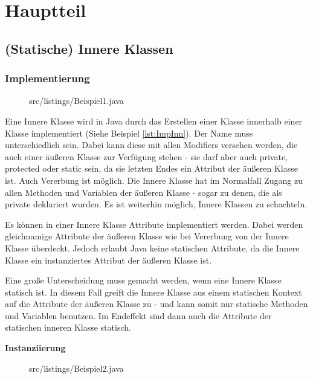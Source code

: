 \chapter{Hauptteil}
\section{(Statische) Innere Klassen}
\subsection {Implementierung}


\begin{figure}[hbt]
\lstset{language=Java}
 {src/listings/Beispiel1.java}
\end{figure}


Eine Innere Klasse wird in Java durch das Erstellen einer Klasse innerhalb einer Klasse implementiert (Siehe Beispiel \ref{lst:ImpInn}). Der Name muss unterschiedlich sein. Dabei kann diese mit allen Modifiers versehen werden, die auch einer äußeren Klasse zur Verfügung stehen - sie darf aber auch private, protected oder static sein, da sie letzten Endes ein Attribut der äußeren Klasse ist.
Auch Vererbung ist möglich. Die Innere Klasse hat im Normalfall Zugang zu allen Methoden und Variablen der äußeren Klasse - sogar zu denen, die als private deklariert wurden. Es ist weiterhin möglich, Innere Klassen zu schachteln. 

Es können in einer Innere Klasse Attribute implementiert werden. Dabei werden gleichnamige Attribute der äußeren Klasse wie bei Vererbung von der Innere Klasse überdeckt. Jedoch erlaubt Java keine statischen Attribute, da die Innere Klasse ein instanziertes Attribut der äußeren Klasse ist.

Eine große Unterscheidung muss gemacht werden, wenn eine Innere Klasse statisch ist. In diesem Fall greift die Innere Klasse aus einem statischen Kontext auf die Attribute der äußeren Klasse zu - und kann somit nur statische Methoden und Variablen benutzen. Im Endeffekt sind dann auch die Attribute der statischen inneren Klasse statisch.

{\bf Instanziierung}


\begin{figure}[hbt]
\lstset{language=Java}
 {src/listings/Beispiel2.java}
\end{figure}

